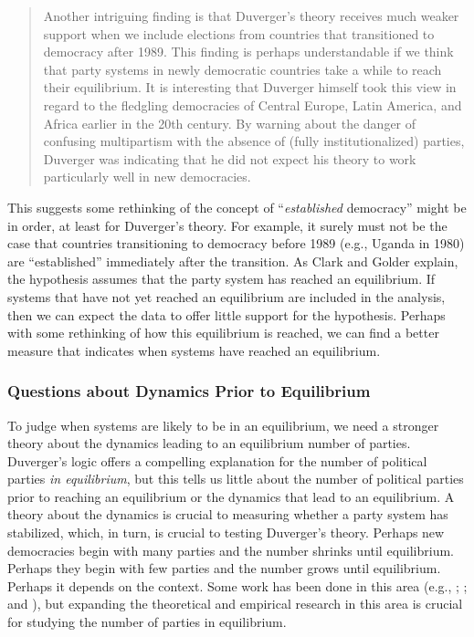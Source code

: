 \documentclass[12pt]{article}
\begin{document}
\begin{quote}
Another intriguing finding is that Duverger's theory receives much weaker support when we include elections from countries that transitioned to democracy after 1989. 
This finding is perhaps understandable if we think that party systems in newly democratic countries take a while to reach their equilibrium. 
It is interesting that Duverger himself took this view in regard to the fledgling democracies of Central Europe, Latin America, and Africa earlier in the 20th century. 
By warning about the danger of confusing multipartism with the absence of (fully institutionalized) parties, Duverger was indicating that he did not expect his theory to work particularly well in new democracies. 
\end{quote}

This suggests some rethinking of the concept of ``\textit{established} democracy'' might be in order, at least for Duverger's theory. 
For example, it surely must not be the case that countries transitioning to democracy before 1989 (e.g., Uganda in 1980) are ``established'' immediately after the transition. 
As Clark and Golder explain, the hypothesis assumes that the party system has reached an equilibrium. 
If systems that have not yet reached an equilibrium are included in the analysis, then we can expect the data to offer little support for the hypothesis. 
Perhaps with some rethinking of how this equilibrium is reached, we can find a better measure that indicates when systems have reached an equilibrium.


\subsubsection*{Questions about Dynamics Prior to Equilibrium}

To judge when systems are likely to be in an equilibrium, we need a stronger theory about the dynamics leading to an equilibrium number of parties. 
Duverger's logic offers a compelling explanation for the number of political parties \textit{in equilibrium}, but this tells us little about the number of political parties prior to reaching an equilibrium or the dynamics that lead to an equilibrium. 
A theory about the dynamics is crucial to measuring whether a party system has stabilized, which, in turn, is crucial to testing Duverger's theory. 
Perhaps new democracies begin with many parties and the number shrinks until equilibrium. 
Perhaps they begin with few parties and the number grows until equilibrium. 
Perhaps it depends on the context. 
Some work has been done in this area (e.g.,  \citealt{Moser1999}; \citealt{CrispOlivelloPotter2012}; and \citealt{Ferrara2011}), but expanding the theoretical and empirical research in this area is crucial for studying the number of parties in equilibrium. 
\end{document}
